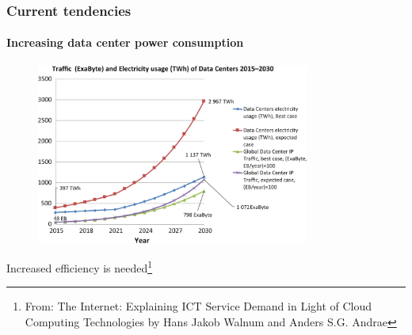 \documentclass{beamer}
\begin{document}
    \begin{frame}
  \frametitle{Current tendencies}
  \framesubtitle{Increasing data center power consumption}
      \begin{figure}
      \centering
      \includegraphics[width=0.8\textwidth]{figures/power_usage.png}
    \end{figure}
    Increased efficiency is needed\footnote{\tiny From: The Internet: Explaining
      ICT Service Demand in Light of Cloud Computing Technologies by Hans Jakob
      Walnum and Anders S.G. Andrae}
    
  \end{frame}
\end{document}
